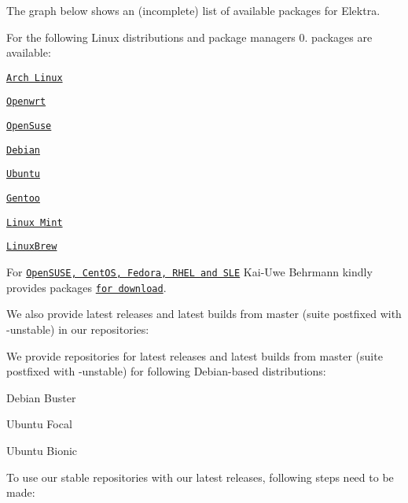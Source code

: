 The graph below shows an (incomplete) list of available packages for Elektra.

\href{https://repology.org/metapackage/elektra/versions}{\tt }

For the following Linux distributions and package managers 0. packages are available\+:


\begin{DoxyItemize}
\item \href{https://aur.archlinux.org/packages/elektra/}{\tt Arch Linux}
\item \href{https://github.com/openwrt/packages/tree/master/libs/elektra}{\tt Openwrt}
\item \href{https://software.opensuse.org/package/elektra}{\tt Open\+Suse}
\item \href{https://packages.debian.org/de/jessie/libelektra4}{\tt Debian}
\item \href{https://launchpad.net/ubuntu/+source/elektra}{\tt Ubuntu}
\item \href{http://packages.gentoo.org/package/app-admin/elektra}{\tt Gentoo}
\item \href{https://community.linuxmint.com/software/view/elektra-bin}{\tt Linux Mint}
\item \href{https://github.com/Linuxbrew/homebrew-core/blob/master/Formula/elektra.rb}{\tt Linux\+Brew}
\end{DoxyItemize}

For \href{https://build.opensuse.org/package/show/home:bekun:devel/elektra}{\tt Open\+S\+U\+SE, Cent\+OS, Fedora, R\+H\+EL and S\+LE} Kai-\/\+Uwe Behrmann kindly provides packages \href{http://software.opensuse.org/download.html?project=home%3Abekun%3Adevel&package=libelektra4}{\tt for download}.

We also provide latest releases and latest builds from master (suite postfixed with {\ttfamily -\/unstable}) in our repositories\+:

We provide repositories for latest releases and latest builds from master (suite postfixed with {\ttfamily -\/unstable}) for following Debian-\/based distributions\+:


\begin{DoxyItemize}
\item Debian Buster
\item Ubuntu Focal
\item Ubuntu Bionic
\end{DoxyItemize}

To use our stable repositories with our latest releases, following steps need to be made\+:


